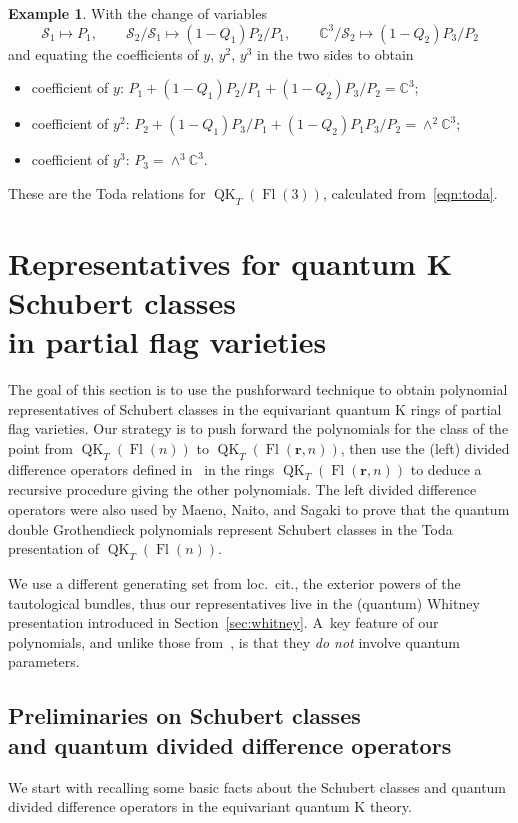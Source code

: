 \documentclass[pdftex]{sigma}
\numberwithin{equation}{section}
\theoremstyle{definition}
\newtheorem{Example}[Theorem]{Example}
\DeclareMathOperator{\Fl}{Fl}
\DeclareMathOperator{\QK}{QK}
\newcommand{\bfr}{{\mathbf r}}
\newcommand{\C}{{\mathbb C}}
\begin{document}
\begin{Example}
 With the change of variables
 \[ \mathcal{S}_1 \mapsto P_1, \qquad \mathcal{S}_2/\mathcal{S}_1 \mapsto (1-Q_1) P_2/P_1 , \qquad \mathbb{C}^3/\mathcal{S}_2 \mapsto ({1-Q_2})P_3/P_2 \]
 and equating the coefficients of $y$, $y^2$, $y^3$ in the two sides to obtain
 \begin{itemize}\itemsep=0pt
 \item coefficient of $y$: $P_1 + (1 - Q_1) P_2/P_1 + (1 - Q_2) P_3/P_2 =\C^3$;
 \item coefficient of $y^2$: $P_2 + (1-Q_1)P_3/P_1 + (1-Q_2) P_1P_3/P_2 =\wedge^2 \C^3$;
 \item coefficient of $y^3$: $P_3= \wedge^3 \C^3$.
 \end{itemize}
 These are the Toda relations for $\QK_T(\Fl(3))$, calculated from~\eqref{eqn:toda}.
 \end{Example}

\section[Representatives for quantum K Schubert classes in partial flag varieties]{Representatives for quantum K Schubert classes\\ in partial flag varieties}%

The goal of this section is to use the pushforward technique to
obtain polynomial representatives of Schubert classes in the equivariant quantum K rings of
partial flag varieties. Our strategy is to push forward
the polynomials for the class of the point from $\QK_T(\Fl(n))$ to $\QK_T(\Fl(\bfr,n))$, then use the
(left) divided difference operators defined in~\cite{Mihalcea2022Left}
in the rings $\QK_T(\Fl(\bfr,n))$
to deduce a recursive procedure giving
the other polynomials. The left divided difference operators were
also used by Maeno, Naito, and Sagaki
\cite{maeno2023presentation} to prove that the
quantum double Grothendieck polynomials represent Schubert classes in the Toda
presentation of $\QK_T(\Fl(n))$.

We use a different generating set from loc.\ cit.,
the exterior powers of the tautological bundles, thus our representatives
live in the (quantum) Whitney presentation introduced in Section~\ref{sec:whitney}.
A~key feature of our polynomials, and unlike those from~\cite{maeno2023presentation},
is that they {\em do not} involve quantum parameters.

\subsection[Preliminaries on Schubert classes and quantum divided difference operators]{Preliminaries on Schubert classes\\ and quantum divided difference operators}
We start with recalling some basic facts about the Schubert classes and
quantum divided difference operators in the equivariant quantum K theory.
\end{document}
